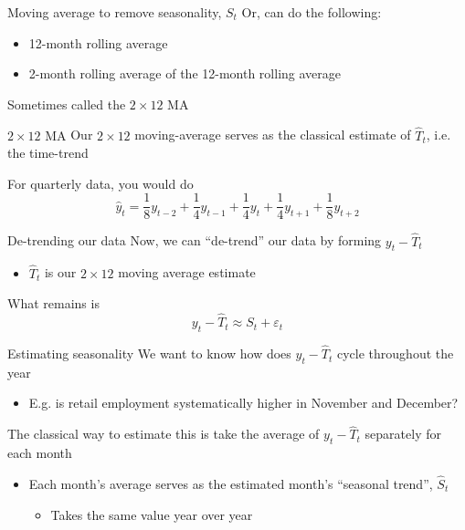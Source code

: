 \documentclass[aspectratio=169,t,11pt,table]{beamer}
\begin{document}
\begin{frame}{Moving average to remove seasonality, $S_t$}
  Or, can do the following:
  \begin{itemize}
    \item 12-month rolling average
    \item 2-month rolling average of the 12-month rolling average
  \end{itemize}

  Sometimes called the $2 \times 12$ MA
\end{frame}


\begin{frame}{$2 \times 12$ MA}
  Our $2 \times 12$ moving-average serves as the classical estimate of $\hat{T}_t$, i.e. the time-trend

  \pause
  \bigskip
  For quarterly data, you would do
  $$
    \hat{y}_t = \frac{1}{8} y_{t-2} + \frac{1}{4} y_{t-1} + \frac{1}{4} y_{t} + \frac{1}{4} y_{t+1}+ \frac{1}{8} y_{t+2}
  $$
\end{frame}

\begin{frame}{De-trending our data}
  Now, we can ``de-trend'' our data by forming $y_t - \hat{T}_t$
  \begin{itemize}
    \item $\hat{T}_t$ is our $2 \times 12$ moving average estimate
  \end{itemize}

  \bigskip
  What remains is 
  $$
    y_t - \hat{T}_t \approx S_t + \varepsilon_t
  $$
\end{frame}

\begin{frame}{Estimating seasonality}
  We want to know how does $y_t - \hat{T}_t$ cycle throughout the year
  \begin{itemize}
    \item E.g. is retail employment systematically higher in November and December?
  \end{itemize}

  \bigskip
  The classical way to estimate this is take the average of $y_t - \hat{T}_t$ separately for each month
  \begin{itemize}
    \item Each month's average serves as the estimated month's ``seasonal trend'', $\hat{S}_t$
    \begin{itemize}
      \item Takes the same value year over year
    \end{itemize}
  \end{itemize}
\end{frame}
\end{document}
